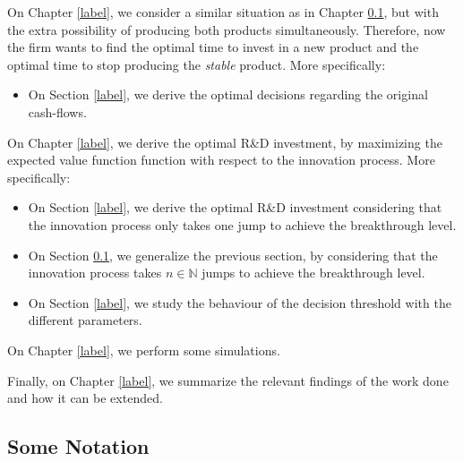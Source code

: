 On Chapter \ref{label}, we consider a similar situation as in Chapter \ref{}, but with the extra possibility of producing both products simultaneously. Therefore, now the firm wants to find the optimal time to invest in a new product and the optimal time to stop producing the \textit{stable} product.  More specifically:
\begin{itemize}
	\item On Section \ref{label}, we derive the optimal decisions regarding the original cash-flows.
\end{itemize}

On Chapter \ref{label}, we derive the optimal R\&D investment, by maximizing the expected value function function with respect to the innovation process. More specifically:
\begin{itemize}
	\item On Section \ref{label}, we derive the optimal R\&D investment considering that the innovation process only takes one jump to achieve the breakthrough level.
	
	\item On Section \ref{}, we generalize the previous section, by considering that the innovation process takes $n \in \mathds{N}$ jumps to achieve the breakthrough level.
	
	\item On Section \ref{label}, we study the behaviour of the decision threshold with the different parameters.
\end{itemize}


On Chapter \ref{label}, we perform some simulations.

Finally, on Chapter \ref{label}, we summarize the relevant findings of the work done and how it can be extended.




\subsection{Some Notation}

